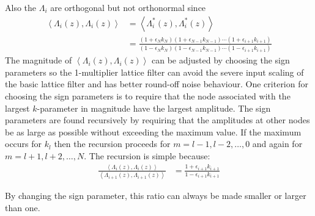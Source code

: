 \documentclass[a4paper,twoside,10pt,english]{report}
\begin{document}
 Also the $\Lambda_{i}$ are orthogonal but not orthonormal since
\begin{align}
\left\langle \Lambda_{i}\left(z\right),\Lambda_{i}\left(z\right)\right\rangle  & = \left\langle \Lambda_{i}^{*}\left(z\right),\Lambda_{i}^{*}\left(z\right)\right\rangle \label{eq:OneMultPowerStar}\\
 & = \frac{\left(1+\epsilon_{N}k_{N}\right)\left(1+\epsilon_{N-1}k_{N-1}\right)\cdots\left(1+\epsilon_{i+1}k_{i+1}\right)}{\left(1-\epsilon_{N}k_{N}\right)\left(1-\epsilon_{N-1}k_{N-1}\right)\cdots\left(1-\epsilon_{i+1}k_{i+1}\right)}\label{eq:OneMultAmplitude}
\end{align}
The magnitude of $\left\langle \Lambda_{i}\left(z\right),\Lambda_{i}\left(z\right)\right\rangle $
can be adjusted by choosing the sign parameters so the 1-multiplier
lattice filter can avoid the severe input scaling of the basic lattice
filter and has better round-off noise behaviour. One criterion for
choosing the sign parameters is to require that the node associated
with the largest $k$-parameter in magnitude have the largest 
amplitude\cite{GrayMarkel_DigitalLatticeAndLadderFilterSynthesis}.
The sign parameters are found recursively by requiring that the amplitudes
at other nodes be as large as possible without exceeding the maximum
value. If the maximum occurs for $k_{l}$ then the recursion proceeds
for $m=l-1,l-2,\ldots,0$ and again for $m=l+1,l+2,\ldots,N$. The
recursion is simple because:
\begin{align*}
\frac{\left\langle \Lambda_{i}\left(z\right),\Lambda_{i}\left(z\right)\right\rangle }{\left\langle \Lambda_{i+1}\left(z\right),\Lambda_{i+1}\left(z\right)\right\rangle } & = \frac{1+\epsilon_{i+1}k_{i+1}}{1-\epsilon_{i+1}k_{i+1}}
\end{align*}

By changing the sign parameter, this ratio can always be made smaller or larger 
than one.
\end{document}
